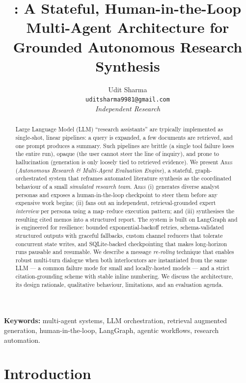 \documentclass[10pt,twocolumn]{article}
\title{\vspace{-1.2em}\textbf{\ares{}: A Stateful, Human-in-the-Loop Multi-Agent
Architecture for Grounded Autonomous Research Synthesis}}
\author{%
  \normalsize Udit Sharma\\[2pt]
  \small \texttt{uditsharma9981@gmail.com}\\[2pt]
  \small \textit{Independent Research}
}
\date{}
\newcommand{\ares}{\textsc{Ares}}
\begin{document}
\maketitle

\begin{abstract}
\noindent
Large Language Model (LLM) ``research assistants'' are typically implemented as
single-shot, linear pipelines: a query is expanded, a few documents are
retrieved, and one prompt produces a summary. Such pipelines are brittle
(a single tool failure loses the entire run), opaque (the user cannot steer the
line of inquiry), and prone to hallucination (generation is only loosely tied to
retrieved evidence). We present \ares{} (\emph{Autonomous Research \&
Multi-Agent Evaluation Engine}), a stateful, graph-orchestrated system that
reframes automated literature synthesis as the coordinated behaviour of a small
\emph{simulated research team}. \ares{} (i) generates diverse analyst personas
and exposes a human-in-the-loop checkpoint to steer them before any expensive
work begins; (ii) fans out an independent, retrieval-grounded expert
\emph{interview} per persona using a map--reduce execution pattern; and (iii)
synthesises the resulting cited memos into a structured report. The system is
built on LangGraph and is engineered for resilience: bounded exponential-backoff
retries, schema-validated structured outputs with graceful fallbacks, custom
channel reducers that tolerate concurrent state writes, and SQLite-backed
checkpointing that makes long-horizon runs pausable and resumable. We describe a
message \emph{re-roling} technique that enables robust multi-turn dialogue when
both interlocutors are instantiated from the same LLM --- a common failure mode
for small and locally-hosted models --- and a strict citation-grounding scheme
with stable inline numbering. We discuss the architecture, its design rationale,
qualitative behaviour, limitations, and an evaluation agenda.
\end{abstract}

\vspace{0.4em}
\noindent\textbf{Keywords:} multi-agent systems, LLM orchestration, retrieval
augmented generation, human-in-the-loop, LangGraph, agentic workflows, research
automation.

\section{Introduction}
\label{sec:intro}
\end{document}
